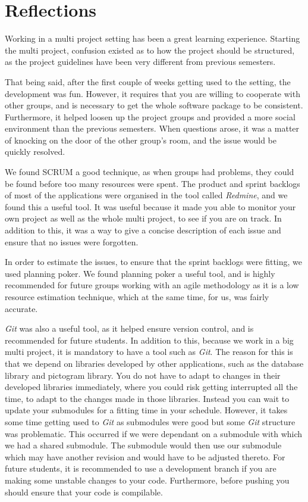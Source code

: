 \chapter{Reflections}
Working in a multi project setting has been a great learning experience.
Starting the multi project, confusion existed as to how the project should be structured, as the project guidelines have been very different from previous semesters.

That being said, after the first couple of weeks getting used to the setting, the development was fun.
However, it requires that you are willing to cooperate with other groups, and is necessary to get the whole software package to be consistent.
Furthermore, it helped loosen up the project groups and provided a more social environment than the previous semesters.
When questions arose, it was a matter of knocking on the door of the other group's room, and the issue would be quickly resolved.

We found SCRUM a good technique, as when groups had problems, they could be found before too many resources were spent.
The product and sprint backlogs of most of the applications were organised in the tool called \textit{Redmine}, and we found this a useful tool.
It was useful because it made you able to monitor your own project as well as the whole multi project, to see if you are on track.
In addition to this, it was a way to give a concise description of each issue and ensure that no issues were forgotten.

In order to estimate the issues, to ensure that the sprint backlogs were fitting, we used planning poker.
We found planning poker a useful tool, and is highly recommended for future groups working with an agile methodology as it is a low resource estimation technique, which at the same time, for us, was fairly accurate.

\textit{Git} was also a useful tool, as it helped ensure version control, and is recommended for future students.
In addition to this, because we work in a big multi project, it is mandatory to have a tool such as \textit{Git}.
The reason for this is that we depend on libraries developed by other applications, such as the database library and pictogram library.
You do not have to adapt to changes in their developed libraries immediately, where you could risk getting interrupted all the time, to adapt to the changes made in those libraries. 
Instead you can wait to update your submodules for a fitting time in your schedule.
However, it takes some time getting used to \textit{Git} as submodules were good but some \textit{Git} structure was problematic.
This occurred if we were dependant on a submodule with which we had a shared submodule.
The submodule would then use our submodule which may have another revision and would have to be adjusted thereto.
For future students, it is recommended to use a development branch if you are making some unstable changes to your code.
Furthermore, before pushing you should ensure that your code is compilable.

